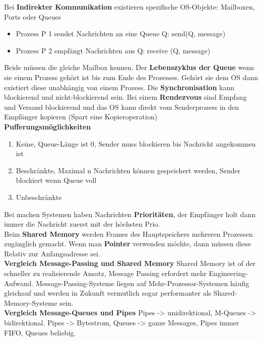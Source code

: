 \documentclass[8pt]{extarticle}
\let\oldtextbf\textbf
\renewcommand{\textbf}{\tiny\oldtextbf}
\begin{document}
\begin{multicols*}{5}
	Bei \textbf{Indirekter Kommunikation} existieren spezifische OS-Objekte: Mailboxen, Ports oder Queues
	\begin{itemize} [noitemsep, topsep=0pt, leftmargin=*]
		\item Prozess P 1 sendet Nachrichten an eine Queue Q: send(Q, message)
		\item Prozess P 2 empfängt Nachrichten aus Q: receive (Q, message)
	\end{itemize} Beide müssen die gleiche Mailbox kennen. Der \textbf{Lebenszyklus der Queue} wenn sie einem Prozess gehört ist bis zum Ende des Prozesses. Gehört sie dem OS dann existiert diese unabhängig von einem Prozess. Die \textbf{Synchronisation} kann blockierend und nicht-blockierend sein. Bei einem \textbf{Rendezvous} sind Empfang und Versand blockierend und das OS kann direkt vom Senderprozess in den Empfänger kopieren (Spart eine Kopieroperation)\\
	\textbf{Pufferungsmöglichkeiten}
	\begin{enumerate} [noitemsep, topsep=0pt, leftmargin=*]
		\item Keine, Queue-Länge ist 0, Sender muss blockieren bis Nachricht angekommen ist
		\item Beschränkte, Maximal n Nachrichten können gespeichert werden, Sender blockiert wenn Queue voll
		\item Unbeschränkte
	\end{enumerate}
	Bei machen Systemen haben Nachrichten \textbf{Prioritäten}, der Empfänger holt dann immer die Nachricht zuerst mit der höchsten Prio.\\
	
	Beim \textbf{Shared Memory} werden Frames des Hauptspeichers mehreren Prozessen zugänglich gemacht. Wenn man \textbf{Pointer} verwenden möchte, dann müssen diese Relativ zur Anfangsadresse sei.\\
	
	\textbf{Vergleich Message-Passing und Shared Memory} Shared Memory ist of der schneller zu realisierende Ansatz, Message Passing erfordert mehr Engineering-Aufwand. Message-Passing-Systeme liegen auf Mehr-Prozessor-Systemen häufig gleichauf und werden in Zukunft vermutlich sogar performanter als Shared-Memory-Systeme sein.\\
	
	\textbf{Vergleich Message-Queues und Pipes} Pipes -> unidirektional, M-Queues -> bidirektional. Pipes -> Bytestrom, Queues -> ganze Messages, Pipes immer FIFO, Queues beliebig.
	

\end{multicols*}
\end{document}
